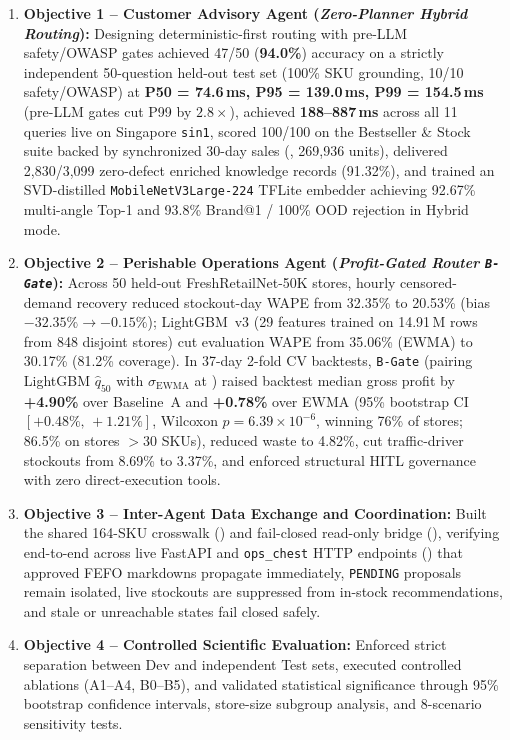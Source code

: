 \begin{enumerate}
    \item \textbf{Objective 1 -- Customer Advisory Agent (\emph{Zero-Planner Hybrid Routing}):} Designing deterministic-first routing with pre-LLM safety/OWASP gates achieved 47/50 (\textbf{94.0\%}) accuracy on a strictly independent 50-question held-out test set (100\% SKU grounding, 10/10 safety/OWASP) at \textbf{P50 = 74.6\,ms, P95 = 139.0\,ms, P99 = 154.5\,ms} (pre-LLM gates cut P99 by $2.8\times$), achieved \textbf{188--887\,ms} across all 11 queries live on Singapore \texttt{sin1}, scored 100/100 on the Bestseller \& Stock suite backed by synchronized 30-day sales (, 269,936 units), delivered 2,830/3,099 zero-defect enriched knowledge records (91.32\%), and trained an SVD-distilled \texttt{MobileNetV3Large-224} TFLite embedder achieving 92.67\% multi-angle Top-1 and 93.8\% Brand@1 / 100\% OOD rejection in Hybrid mode.
    \item \textbf{Objective 2 -- Perishable Operations Agent (\emph{Profit-Gated Router \texttt{B-Gate}}):} Across 50 held-out FreshRetailNet-50K stores, hourly censored-demand recovery reduced stockout-day WAPE from 32.35\% to 20.53\% (bias $-32.35\% \to -0.15\%$); LightGBM~v3 (29 features trained on 14.91\,M rows from 848 disjoint stores) cut evaluation WAPE from 35.06\% (EWMA) to 30.17\% (81.2\% coverage). In 37-day 2-fold CV backtests, \texttt{B-Gate} (pairing LightGBM $\hat{q}_{50}$ with $\sigma_{\text{EWMA}}$ at ) raised backtest median gross profit by \textbf{+4.90\%} over Baseline~A and \textbf{+0.78\%} over EWMA (95\% bootstrap CI $[+0.48\%,\,+1.21\%]$, Wilcoxon $p = 6.39\times 10^{-6}$, winning 76\% of stores; 86.5\% on stores $>30$ SKUs), reduced waste to 4.82\%, cut traffic-driver stockouts from 8.69\% to 3.37\%, and enforced structural HITL governance with zero direct-execution tools.
    \item \textbf{Objective 3 -- Inter-Agent Data Exchange and Coordination:} Built the shared 164-SKU crosswalk () and fail-closed read-only bridge (), verifying end-to-end across live FastAPI and \texttt{ops\_chest} HTTP endpoints () that approved FEFO markdowns propagate immediately, \texttt{PENDING} proposals remain isolated, live stockouts are suppressed from in-stock recommendations, and stale or unreachable states fail closed safely.
    \item \textbf{Objective 4 -- Controlled Scientific Evaluation:} Enforced strict separation between Dev and independent Test sets, executed controlled ablations (A1--A4, B0--B5), and validated statistical significance through 95\% bootstrap confidence intervals, store-size subgroup analysis, and 8-scenario sensitivity tests.
\end{enumerate}

